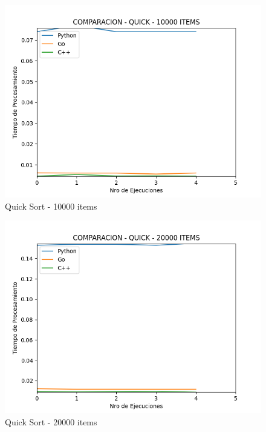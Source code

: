 \documentclass[12pt]{article} %
\begin{document}
    \begin{figure}[H]
    \centering
    \includegraphics[width=\textwidth]{quick_10000}
    \caption{Quick Sort - 10000 items}
    \end{figure}

    \vspace{5mm}
    
    \begin{figure}[H]
    \centering
    \includegraphics[width=\textwidth]{quick_20000}
    \caption{Quick Sort - 20000 items}
    \end{figure}

    \vspace{5mm}
    
\end{document}
